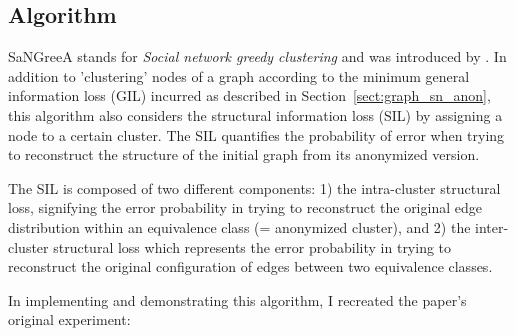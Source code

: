\documentclass{llncs}
\begin{document}
\subsection{Algorithm}
\label{ssect:algorithm}

SaNGreeA stands for \textit{Social network greedy clustering} and was introduced by \cite{campan2009data}. In addition to 'clustering' nodes of a graph according to the minimum general information loss (GIL) incurred as described in Section~\ref{sect:graph_sn_anon}, this algorithm also considers the structural information loss (SIL) by assigning a node to a certain cluster. The SIL quantifies the probability of error when trying to reconstruct the structure of the initial graph from its anonymized version.

The SIL is composed of two different components: 1) the intra-cluster structural loss, signifying the error probability in trying to reconstruct the original edge distribution within an equivalence class (= anonymized cluster), and 2) the inter-cluster structural loss which represents the error probability in trying to reconstruct the original configuration of edges between two equivalence classes.

In implementing and demonstrating this algorithm, I recreated the paper's original experiment:
\end{document}
